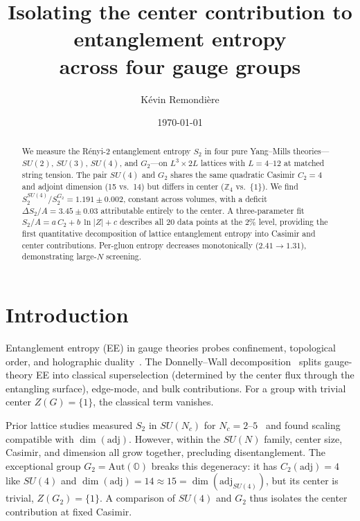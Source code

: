 \documentclass[twocolumn,prl,nofootinbib,superscriptaddress]{revtex4-2}
\begin{document}
\title{Isolating the center contribution to entanglement entropy\\across four gauge groups}

\author{K\'evin Remondi\`ere}

\date{\today}

\begin{abstract}
We measure the R\'enyi-2 entanglement entropy $S_2$ in four pure Yang--Mills theories---$SU(2)$, $SU(3)$, $SU(4)$, and $G_2$---on $L^3 \times 2L$ lattices with $L = 4$--$12$ at matched string tension. The pair $SU(4)$ and $G_2$ shares the same quadratic Casimir $C_2 = 4$ and adjoint dimension (15 vs.\ 14) but differs in center ($\mathbb{Z}_4$ vs.\ $\{1\}$). We find $S_2^{SU(4)}/S_2^{G_2} = 1.191 \pm 0.002$, constant across volumes, with a deficit $\Delta S_2/A = 3.45 \pm 0.03$ attributable entirely to the center. A three-parameter fit $S_2/A = a\,C_2 + b\,\ln|Z| + c$ describes all 20 data points at the $2\%$ level, providing the first quantitative decomposition of lattice entanglement entropy into Casimir and center contributions. Per-gluon entropy decreases monotonically ($2.41 \to 1.31$), demonstrating large-$N$ screening.
\end{abstract}

\maketitle

\section{Introduction}

Entanglement entropy (EE) in gauge theories probes confinement, topological order, and holographic duality~\cite{Donnelly2012,Buividovich2008,Rabenstein2019}. The Donnelly--Wall decomposition~\cite{Donnelly2012} splits gauge-theory EE into classical superselection (determined by the center flux through the entangling surface), edge-mode, and bulk contributions. For a group with trivial center $Z(G) = \{1\}$, the classical term vanishes.

Prior lattice studies measured $S_2$ in $SU(N_c)$ for $N_c = 2$--$5$~\cite{Rabenstein2019} and found scaling compatible with $\dim(\mathrm{adj})$. However, within the $SU(N)$ family, center size, Casimir, and dimension all grow together, precluding disentanglement. The exceptional group $G_2 = \mathrm{Aut}(\mathbb{O})$ breaks this degeneracy: it has $C_2(\mathrm{adj}) = 4$ like $SU(4)$ and $\dim(\mathrm{adj}) = 14 \approx 15 = \dim(\mathrm{adj}_{SU(4)})$, but its center is trivial, $Z(G_2) = \{1\}$. A comparison of $SU(4)$ and $G_2$ thus isolates the center contribution at fixed Casimir.
\end{document}

